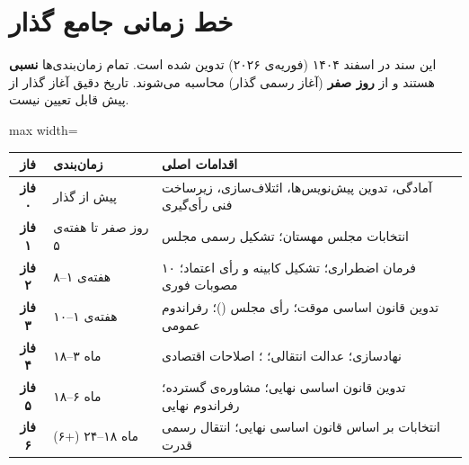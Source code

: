 \chapter{خط زمانی جامع گذار}
\label{ch:timeline}

\begin{notebox}[title={\rl{یادداشت: زمان‌بندی نسبی}}]
	این سند در اسفند ۱۴۰۴ (فوریه‌ی ۲۰۲۶) تدوین شده است. تمام زمان‌بندی‌ها
	\textbf{نسبی} هستند و از \textbf{روز صفر} (آغاز رسمی گذار) محاسبه می‌شوند.
	تاریخ دقیق آغاز گذار از پیش قابل تعیین نیست.
\end{notebox}

\vspace{0.5\baselineskip}
\noindent
\begin{adjustbox}{max width=\linewidth}
	\begin{tabular}{@{}clp{8.5cm}@{}}
		\toprule
		\textbf{فاز} & \textbf{زمان‌بندی} & \textbf{اقدامات اصلی} \\
		\midrule
		\rowcolor{MahestanLightGray}
		\textbf{فاز ۰} & پیش از گذار &
		آمادگی، تدوین پیش‌نویس‌ها، ائتلاف‌سازی، زیرساخت فنی رأی‌گیری \\
		\rowcolor{WarningBg}
		\textbf{فاز ۱} & روز صفر تا هفته‌ی ۵ &
		انتخابات مجلس مهستان؛ تشکیل رسمی مجلس \\
		\rowcolor{DangerBg}
		\textbf{فاز ۲} & هفته‌ی ۱--۸ &
		۱۰ فرمان اضطراری؛ تشکیل کابینه و رأی اعتماد؛ مصوبات فوری \\
		\rowcolor{MahestanLightPurple!40}
		\textbf{فاز ۳} & هفته‌ی ۱--۱۰ &
		تدوین قانون اساسی موقت؛ رأی مجلس (\lr{$\frac{2}{3}$})؛ رفراندوم عمومی \\
		\rowcolor{NodeBg}
		\textbf{فاز ۴} & ماه ۳--۱۸ &
		نهادسازی؛ عدالت انتقالی؛ \lr{SSR}؛ اصلاحات اقتصادی \\
		\rowcolor{MahestanLightBlue!40}
		\textbf{فاز ۵} & ماه ۶--۱۸ &
		تدوین قانون اساسی نهایی؛ مشاوره‌ی گسترده؛ رفراندوم نهایی \\
		\rowcolor{SuccessBg}
		\textbf{فاز ۶} & ماه ۱۸--۲۴ (+۶) &
		انتخابات بر اساس قانون اساسی نهایی؛ انتقال رسمی قدرت \\
		\bottomrule
	\end{tabular}
\end{adjustbox}

